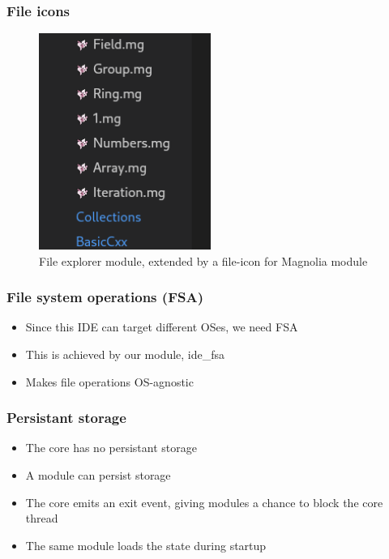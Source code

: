 \begin{frame}
  \frametitle{File icons}
  \begin{figure}
    \centering
    \includegraphics[width=0.5\textwidth]{./pics/file-explorer-icons.png}
    \caption{
      File explorer module, extended by a file-icon for Magnolia module
    }
  \end{figure}
\end{frame}

\begin{frame}
  \frametitle{File system operations (FSA)}
  \begin{itemize}
    \item Since this IDE can target different OSes, we need FSA
    \item This is achieved by our module, ide\_fsa
    \item Makes file operations OS-agnostic
  \end{itemize}
\end{frame}

\begin{frame}
  \frametitle{Persistant storage}
  \begin{itemize}
    \item The core has no persistant storage
    \item A module can persist storage
    \item The core emits an exit event, giving modules a chance to block the
    core thread
    \item The same module loads the state during startup
  \end{itemize}
\end{frame}

